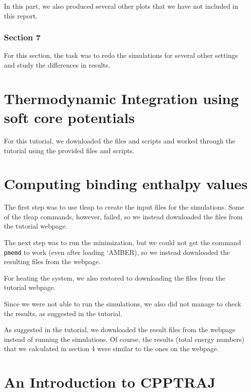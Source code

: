\documentclass[11pt]{article}
\begin{document}
In this part, we also produced several other plots that we have not
included in this report.

\subsubsection{Section 7}\label{section-7}

For this section, the task was to redo the simulations for several other
settings and study the differences in results.

    \section{Thermodynamic Integration using soft core
potentials}\label{thermodynamic-integration-using-soft-core-potentials}

For this tutorial, we downloaded the files and scripts and worked
through the tutorial using the provided files and scripts.

    \section{Computing binding enthalpy
values}\label{computing-binding-enthalpy-values}

The first step was to use tleap to create the input files for the
simulations. Some of the tleap commands, however, failed, so we instead
downloaded the files from the tutorial webpage.

The next step was to run the minimization, but we could not get the
command \texttt{pmemd} to work (even after loading `AMBER), so we
instead downloaded the resulting files from the webpage.

For heating the system, we also restored to downloading the files from
the tutorial webpage.

Since we were not able to run the simulations, we also did not manage to
check the results, as suggested in the tutorial.

As suggested in the tutorial, we downloaded the result files from the
webpage instead of running the simulations. Of course, the results
(total energy numbers) that we calculated in section 4 were similar to
the ones on the webpage.

    \section{An Introduction to CPPTRAJ}\label{an-introduction-to-cpptraj}
\end{document}
